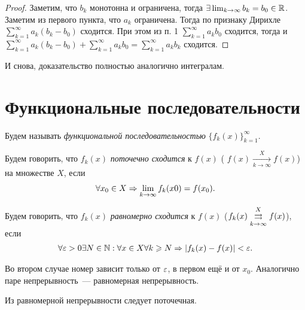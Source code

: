 \documentclass[../main.tex]{subfiles}
\begin{document}
\begin{proof}
  Заметим, что $b_k$ монотонна и ограничена, тогда $\exists \lim_{k \to \infty} b_k = b_0 \in \R$. Заметим из первого пункта, что $a_k$ ограничена. Тогда по признаку Дирихле $ \sum_{k=1}^{\infty} a_k (b_k - b_0)  $ сходится. При этом из п. 1 $ \sum_{k=1}^{\infty} a_k b_0  $ сходится, тогда и $ \sum_{k=1}^{\infty} a_k (b_k - b_0 ) + \sum_{k=1}^{\infty} a_k b_0 = \sum_{k=1}^{\infty} a_k b_k  $ сходится.
\end{proof}


\begin{note}
  И снова, доказательство полностью аналогично интегралам.
\end{note}

\section{Функциональные последовательности}

\begin{definition}
  Будем называть \emph{функциональной последовательностью} $ \{ f_{k}(x) \}_{k = 1}^{\infty} $.
\end{definition}


\begin{definition}
  Будем говорить, что $ f_k(x) $ \emph{поточечно сходится} к $ f(x) $ ( $ f(x)  \xrightarrow[k \to  \infty ]{X} f(x)$) на множестве $ X$, если 
  \begin{gather} 
     \forall x_0 \in X \hence \lim_{k \to \infty } f_k(x0) = f(x_0 ).
  \end{gather}
\end{definition}


\begin{definition}
  Будем говорить, что $ f_k(x) $ \emph{равномерно сходится} к $ f(x) $ ($ f_k(x)  \convergesuniformly{k \to \infty}{X} f(x) $), если 
  \begin{gather} 
    \forall \eps > 0 \exists N \in \N : \forall x \in X \forall k \geq N \Rightarrow \left| f_k(x) - f(x)  \right| < \eps .
  \end{gather} 
\end{definition}


\begin{note}
  Во втором случае номер зависит только от $ \eps$, в первом ещё и от $ x_0 $. Аналогично паре непрерывность~--- равномерная непрерывность.
\end{note}

\begin{proposition}
  Из равномерной непрерывности следует поточечная.
\end{proposition}
\end{document}
